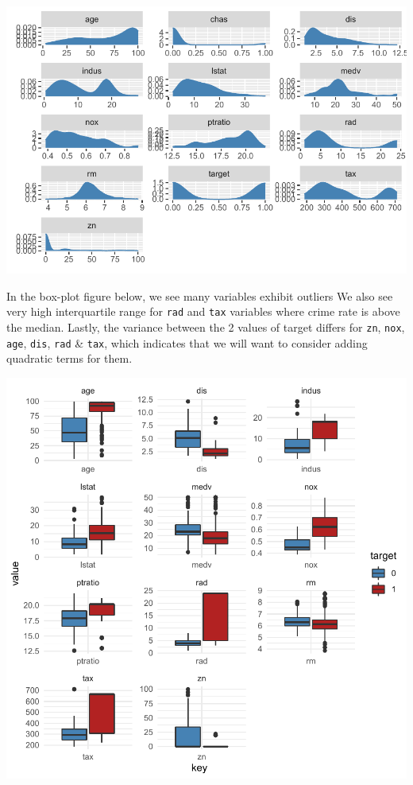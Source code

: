 \documentclass[3p]{elsarticle} %
\begin{document}
\includegraphics{paper_files/figure-latex/unnamed-chunk-3-1.pdf}

\newpage

In the box-plot figure below, we see many variables exhibit outliers We
also see very high interquartile range for \texttt{rad} and \texttt{tax}
variables where crime rate is above the median. Lastly, the variance
between the 2 values of target differs for \texttt{zn}, \texttt{nox},
\texttt{age}, \texttt{dis}, \texttt{rad} \& \texttt{tax}, which
indicates that we will want to consider adding quadratic terms for them.

\includegraphics{paper_files/figure-latex/unnamed-chunk-4-1.pdf}
\end{document}
